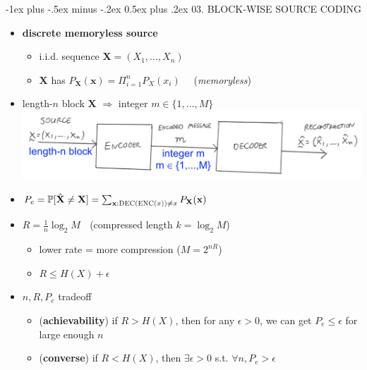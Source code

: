 \documentclass[10pt, landscape]{article}
\makeatletter
\renewcommand{\section}{\@startsection{section}{1}{0mm}%
  {-1ex plus -.5ex minus -.2ex}%
  {0.5ex plus .2ex}%
{\normalfont\large\bfseries}}
\makeatother
\begin{document}
\begin{multicols*}{4}
  \section{03. BLOCK-WISE SOURCE CODING}

  \begin{itemize}
    \item \textbf{discrete memoryless source} 
      \begin{itemize}
        \item i.i.d. sequence $\mathbf{X} = (X_1, \dots, X_n)$
        \item $\mathbf{X}$ has  $P_{\mathbf{X}}(\mathbf{x}) = \Pi^n_{i=1} P_X(x_i)$ $\quad$(\textit{memoryless})
      \end{itemize}
    \item length-$n$ block $\mathbf{X}$
      $\Rightarrow$ integer $m \in \{1, \dots, M\}$
      \includegraphics[width=0.9\linewidth]{cs3236-blockwise-source-coding.png} 
    \item {} 
      $P_e = \mathbb{P}[\hat{\mathbf{X}} \neq {\mathbf{X}}] = \sum_{\mathbf{x}: \textsc{DEC(ENC($x$))} \neq x} P_{\mathbf{X}}(\mathbf{x})$
    \item {} $R = \frac{1}{n}\log_2 M$ $\;$ (compressed length $k = \log_2M$)
      \begin{itemize}
        \item lower rate = more compression ($M = 2^{nR}$)
        \item $R \leq H(X) + \epsilon$
      \end{itemize}
  \end{itemize}

  \begin{itemize}
    \item {} $n, R, P_e$ tradeoff
      \begin{itemize}
        \item (\textbf{achievability}) if $R>H(X)$, then for any $\epsilon > 0$, we can get $P_e \leq \epsilon$ for large enough $n$ 
        \item (\textbf{converse}) if $R<H(X)$, then $\exists\epsilon > 0$ s.t. $\forall n, P_e > \epsilon$
      \end{itemize}
  \end{itemize}


\end{multicols*}
\end{document}
